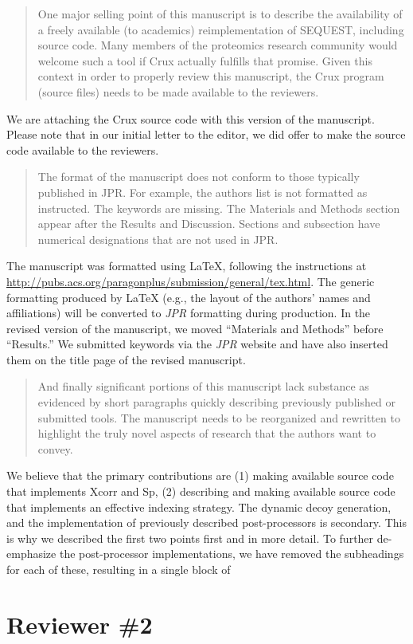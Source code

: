 \documentclass{article}
\newcommand{\breview}{\begin{quotation}\begin{em}\noindent}
\newcommand{\ereview}{\end{em}\end{quotation}}
\begin{document}
\breview One major selling point of this manuscript is to describe the
availability of a freely available (to academics) reimplementation of
SEQUEST, including source code.  Many members of the proteomics
research community would welcome such a tool if Crux actually fulfills
that promise.  Given this context in order to properly review this
manuscript, the Crux program (source files) needs to be made available
to the reviewers. \ereview

We are attaching the Crux source code with this version of the
manuscript.  Please note that in our initial letter to the editor, we
did offer to make the source code available to the reviewers.

\breview The format of the manuscript does not conform to those
typically published in JPR.  For example, the authors list is not
formatted as instructed.  The keywords are missing.  The Materials and
Methods section appear after the Results and Discussion.  Sections and
subsection have numerical designations that are not used in
JPR. \ereview

The manuscript was formatted using LaTeX, following the instructions
at \url{http://pubs.acs.org/paragonplus/submission/general/tex.html}.
The generic formatting produced by LaTeX (e.g., the layout of the
authors' names and affiliations) will be converted to {\em JPR}
formatting during production.  In the revised version of the
manuscript, we moved ``Materials and Methods'' before ``Results.''  We
submitted keywords via the {\em JPR} website and have also inserted
them on the title page of the revised manuscript.

\breview And finally significant portions of this manuscript lack
substance as evidenced by short paragraphs quickly describing
previously published or submitted tools.  The manuscript needs to be
reorganized and rewritten to highlight the truly novel aspects of
research that the authors want to convey. \ereview

We believe that the primary contributions are (1) making available
source code that implements Xcorr and Sp, (2) describing and making
available source code that implements an effective indexing strategy.
The dynamic decoy generation, and the implementation of previously
described post-processors is secondary.  This is why we described the
first two points first and in more detail.  To further de-emphasize
the post-processor implementations, we have removed the subheadings
for each of these, resulting in a single block of 

\section*{Reviewer \#2}
\end{document}
